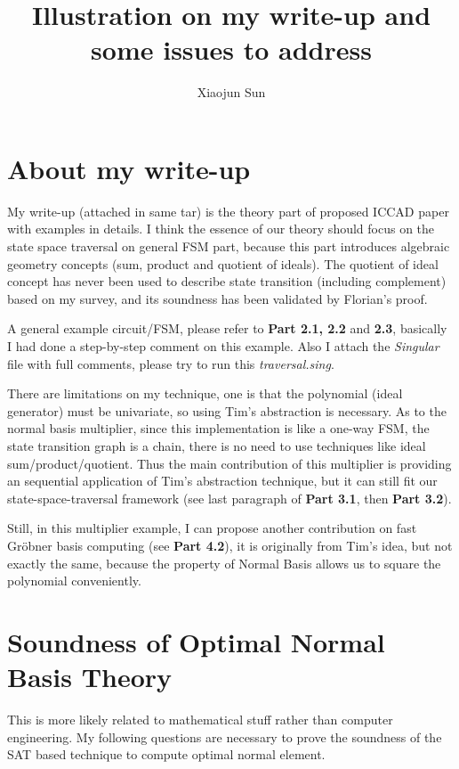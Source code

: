 \documentclass[12pt,letterpaper]{article}
\begin{document}
\title{Illustration on my write-up and some issues to address}
\author{Xiaojun Sun}
\maketitle

\section{About my write-up}
My write-up (attached in same tar) is the theory part of proposed ICCAD paper with examples in details. I think
the essence of our theory should focus on the state space traversal on general FSM part, because this part
introduces algebraic geometry concepts (sum, product and quotient of ideals). The quotient of ideal concept has never
been used to describe state transition (including complement) based on my survey, and its soundness has been
validated by Florian's proof.

A general example circuit/FSM, please refer to \textbf{Part 2.1, 2.2} and {\bf 2.3}, basically I had done a step-by-step comment on 
this example. Also I attach the \emph{Singular} file with full comments, please try to run this \emph{traversal.sing}.

There are limitations on my technique, one is that the polynomial (ideal generator) must be univariate, so using
Tim's abstraction is necessary. As to the normal basis multiplier, since this implementation is like a one-way
FSM, the state transition graph is a chain, there is no need to use techniques like ideal sum/product/quotient.
Thus the main contribution of this multiplier is providing an sequential application of Tim's abstraction technique,
but it can still fit our state-space-traversal framework (see last paragraph of \textbf{Part 3.1}, then \textbf{Part 3.2}).

Still, in this multiplier example, I can propose another contribution on fast Gr\"obner basis computing (see \textbf{Part 4.2}),
it is originally from Tim's idea, but not exactly the same, because the property of Normal Basis allows us
to square the polynomial conveniently.

\section{Soundness of Optimal Normal Basis Theory}
This is more likely related to mathematical stuff rather than computer engineering. My following questions are necessary to
prove the soundness of the SAT based technique to compute optimal normal element.
\end{document}
